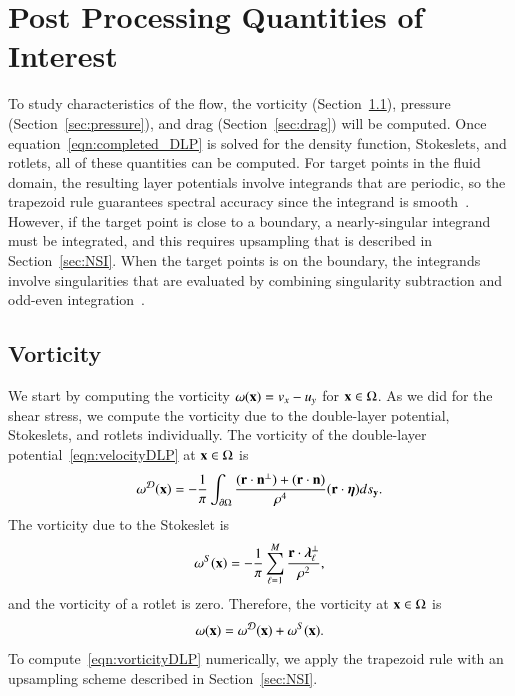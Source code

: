 \documentclass[preprint, 10pt]{elsarticle}
\begin{document}
\section{Post Processing Quantities of Interest}
\label{s:qoi}
To study characteristics of the flow, the vorticity
(Section~\ref{sec:vorticity}), pressure (Section~\ref{sec:pressure}),
and drag (Section~\ref{sec:drag}) will be computed.  Once
equation~\eqref{eqn:completed_DLP} is solved for the density function,
Stokeslets, and rotlets, all of these quantities can be computed.  For
target points in the fluid domain, the resulting layer potentials
involve integrands that are periodic, so the trapezoid rule guarantees
spectral accuracy since the integrand is smooth~\cite{tre-wei2014}.
However, if the target point is close to a boundary, a nearly-singular
integrand must be integrated, and this requires upsampling that is
described in Section~\ref{sec:NSI}.  When the target points is on the
boundary, the integrands involve singularities that are evaluated by
combining singularity subtraction and odd-even
integration~\cite{sid-isr1988}.  



\subsection{Vorticity}
\label{sec:vorticity}
We start by computing the vorticity $\omega({\mathbf{x}}) = v_x - u_y$ for ${\mathbf{x}} \in
\Omega$.  As we did for the shear stress, we compute the vorticity due
to the double-layer potential, Stokeslets, and rotlets individually.
The vorticity of the double-layer potential~\eqref{eqn:velocityDLP} at
${\mathbf{x}} \in \Omega$ is
\begin{align}
  \omega^{{\mathcal{D}}}({\mathbf{x}}) = -\frac{1}{\pi}\int_{{\partial}\Omega} 
    \frac{({\mathbf{r}} \cdot {\mathbf{n}}^\perp) + ({\mathbf{r}} \cdot {\mathbf{n}})}{\rho^4}
    ({\mathbf{r}} \cdot {\boldsymbol\eta}) ds_{{\mathbf{y}}}.
  \label{eqn:vorticityDLP}
\end{align}
The vorticity due to the Stokeslet is
\begin{align*}
  \omega^S({\mathbf{x}}) = -\frac{1}{\pi} \sum_{\ell=1}^{M} 
    \frac{{\mathbf{r}} \cdot {\boldsymbol\lambda}_\ell^\perp}{\rho^2},
\end{align*}
and the vorticity of a rotlet is zero.  Therefore, the vorticity at ${\mathbf{x}}
\in \Omega$ is
\begin{align*}
  \omega({\mathbf{x}}) = \omega^{\mathcal{D}}({\mathbf{x}}) + \omega^S({\mathbf{x}}).
\end{align*}
To compute~\eqref{eqn:vorticityDLP} numerically, we apply the trapezoid
rule with an upsampling scheme described in Section~\ref{sec:NSI}.
\end{document}
